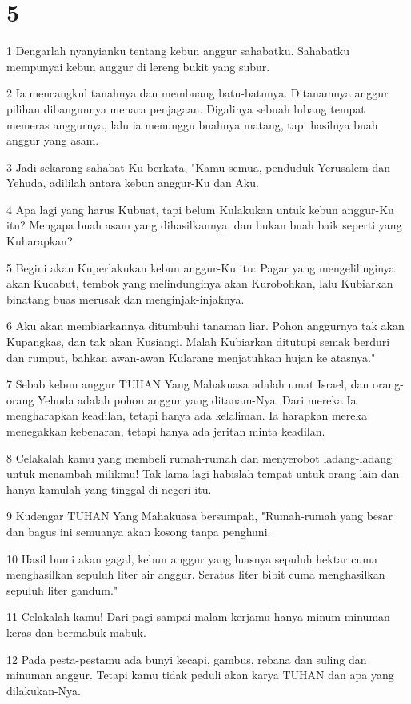 \chapter{5}

\par 1 Dengarlah nyanyianku tentang kebun anggur sahabatku. Sahabatku mempunyai kebun anggur di lereng bukit yang subur.
\par 2 Ia mencangkul tanahnya dan membuang batu-batunya. Ditanamnya anggur pilihan dibangunnya menara penjagaan. Digalinya sebuah lubang tempat memeras anggurnya, lalu ia menunggu buahnya matang, tapi hasilnya buah anggur yang asam.
\par 3 Jadi sekarang sahabat-Ku berkata, "Kamu semua, penduduk Yerusalem dan Yehuda, adililah antara kebun anggur-Ku dan Aku.
\par 4 Apa lagi yang harus Kubuat, tapi belum Kulakukan untuk kebun anggur-Ku itu? Mengapa buah asam yang dihasilkannya, dan bukan buah baik seperti yang Kuharapkan?
\par 5 Begini akan Kuperlakukan kebun anggur-Ku itu: Pagar yang mengelilinginya akan Kucabut, tembok yang melindunginya akan Kurobohkan, lalu Kubiarkan binatang buas merusak dan menginjak-injaknya.
\par 6 Aku akan membiarkannya ditumbuhi tanaman liar. Pohon anggurnya tak akan Kupangkas, dan tak akan Kusiangi. Malah Kubiarkan ditutupi semak berduri dan rumput, bahkan awan-awan Kularang menjatuhkan hujan ke atasnya."
\par 7 Sebab kebun anggur TUHAN Yang Mahakuasa adalah umat Israel, dan orang-orang Yehuda adalah pohon anggur yang ditanam-Nya. Dari mereka Ia mengharapkan keadilan, tetapi hanya ada kelaliman. Ia harapkan mereka menegakkan kebenaran, tetapi hanya ada jeritan minta keadilan.
\par 8 Celakalah kamu yang membeli rumah-rumah dan menyerobot ladang-ladang untuk menambah milikmu! Tak lama lagi habislah tempat untuk orang lain dan hanya kamulah yang tinggal di negeri itu.
\par 9 Kudengar TUHAN Yang Mahakuasa bersumpah, "Rumah-rumah yang besar dan bagus ini semuanya akan kosong tanpa penghuni.
\par 10 Hasil bumi akan gagal, kebun anggur yang luasnya sepuluh hektar cuma menghasilkan sepuluh liter air anggur. Seratus liter bibit cuma menghasilkan sepuluh liter gandum."
\par 11 Celakalah kamu! Dari pagi sampai malam kerjamu hanya minum minuman keras dan bermabuk-mabuk.
\par 12 Pada pesta-pestamu ada bunyi kecapi, gambus, rebana dan suling dan minuman anggur. Tetapi kamu tidak peduli akan karya TUHAN dan apa yang dilakukan-Nya.
